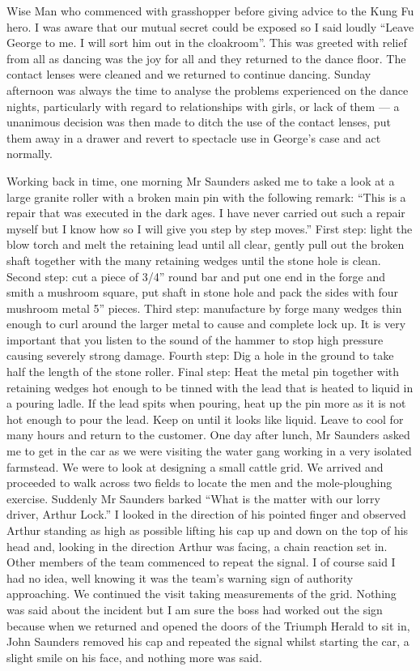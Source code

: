 Wise Man who commenced with grasshopper before giving advice to the Kung Fu
hero. I was aware that our mutual secret could be exposed so I said loudly
``Leave George to me. I will sort him out in the cloakroom''. This was greeted
with relief from all as dancing was the joy for all and they returned to the
dance floor. The contact lenses were cleaned and we returned to continue
dancing. Sunday afternoon was always the time to analyse the problems
experienced on the dance nights, particularly with regard to relationships with
girls, or lack of them --- a unanimous decision was then made to ditch the use
of the contact lenses, put them away in a drawer and revert to spectacle use in
George's case and act normally.

Working back in time, one morning Mr Saunders asked me to take a look at a large
granite roller with a broken main pin with the following remark: ``This is a
repair that was executed in the dark ages. I have never carried out such a
repair myself but I know how so I will give you step by step moves.'' First
step: light the blow torch and melt the retaining lead until all clear, gently
pull out the broken shaft together with the many retaining wedges until the
stone hole is clean. Second step: cut a piece of 3/4'' round bar and put one
end in the forge and smith a mushroom square, put shaft in stone hole and pack
the sides with four mushroom metal 5'' pieces. Third step: manufacture by forge
many wedges thin enough to curl around the larger metal to cause and complete
lock up. It is very important that you listen to the sound of the hammer to
stop high pressure causing severely strong damage. Fourth step: Dig a hole in
the ground to take half the length of the stone roller. Final step: Heat the
metal pin together with retaining wedges hot enough to be tinned with the lead
that is heated to liquid in a pouring ladle. If the lead spits when pouring,
heat up the pin more as it is not hot enough to pour the lead. Keep on until it
looks like liquid. Leave to cool for many hours and return to the customer. One
day after lunch, Mr Saunders asked me to get in the car as we were visiting the
water gang working in a very isolated farmstead. We were to look at designing a
small cattle grid. We arrived and proceeded to walk across two fields to locate
the men and the mole-ploughing exercise. Suddenly Mr Saunders barked ``What is
the matter with our lorry driver, Arthur Lock.'' I looked in the direction of
his pointed finger and observed Arthur standing as high as possible lifting his
cap up and down on the top of his head and, looking in the direction Arthur was
facing, a chain reaction set in. Other members of the team commenced to repeat
the signal. I of course said I had no idea, well knowing it was the team's
warning sign of authority approaching. We continued the visit taking
measurements of the grid. Nothing was said about the incident but I am sure the
boss had worked out the sign because when we returned and opened the doors of
the Triumph Herald to sit in, John Saunders removed his cap and repeated the
signal whilst starting the car, a slight smile on his face, and nothing more was
said.
